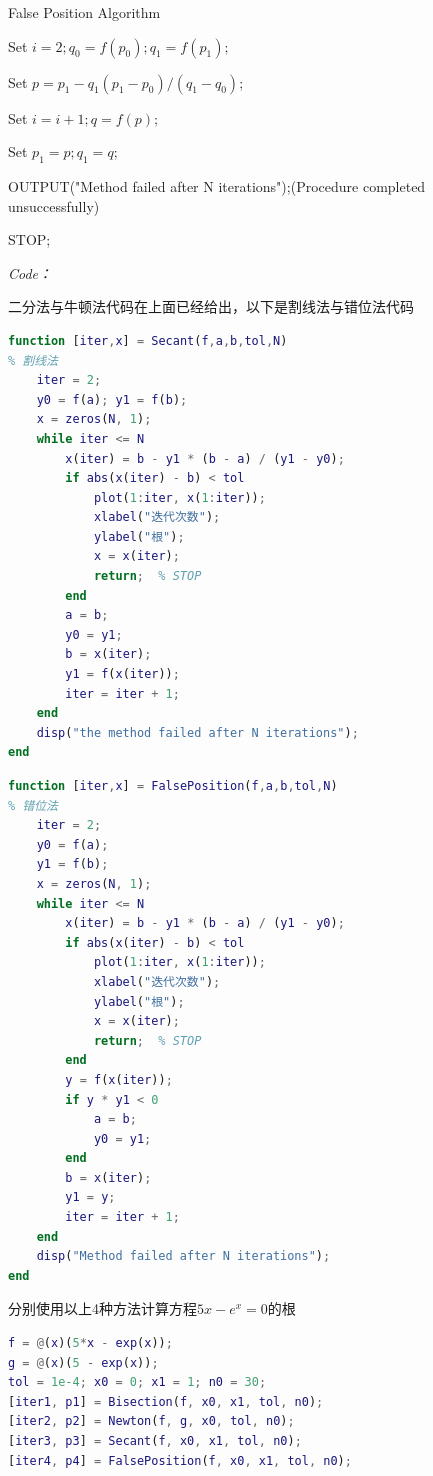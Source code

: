 \documentclass[12pt]{ctexart}
\begin{document}
\begin{algorithm}
	\caption{False Position Algorithm}
	Set $i=2; q_0=f(p_0); q_1=f(p_1);$
	
	{
		Set $p=p_1-q_1(p_1-p_0)/(q_1-q_0)$;
		
		
		Set $i=i+1; q=f(p);$
		
		
		Set $p_1=p; q_1=q;$
	}
	
	OUTPUT("Method failed after N iterations");(Procedure completed unsuccessfully)
	
	STOP;
\end{algorithm}
	
	\textit{Code：}
	
二分法与牛顿法代码在上面已经给出，以下是割线法与错位法代码

\begin{lstlisting}[language = MATLAB]
function [iter,x] = Secant(f,a,b,tol,N)
% 割线法
	iter = 2;
	y0 = f(a); y1 = f(b);
	x = zeros(N, 1);
	while iter <= N
		x(iter) = b - y1 * (b - a) / (y1 - y0);
		if abs(x(iter) - b) < tol
			plot(1:iter, x(1:iter));
			xlabel("迭代次数");
			ylabel("根");
			x = x(iter);
			return;  % STOP
		end
		a = b;
		y0 = y1;
		b = x(iter);
		y1 = f(x(iter));
		iter = iter + 1;
	end
	disp("the method failed after N iterations");
end
\end{lstlisting}

\begin{lstlisting}[language = MATLAB]
function [iter,x] = FalsePosition(f,a,b,tol,N)
% 错位法
	iter = 2;
	y0 = f(a);
	y1 = f(b);
	x = zeros(N, 1);
	while iter <= N
		x(iter) = b - y1 * (b - a) / (y1 - y0);
		if abs(x(iter) - b) < tol
			plot(1:iter, x(1:iter));
			xlabel("迭代次数");
			ylabel("根");
			x = x(iter);
			return;  % STOP
		end
		y = f(x(iter));
		if y * y1 < 0
			a = b;
			y0 = y1;
		end
		b = x(iter);
		y1 = y;
		iter = iter + 1;
	end
	disp("Method failed after N iterations");
end
\end{lstlisting}
分别使用以上4种方法计算方程$5x-e^x=0$的根
\begin{lstlisting}[language = MATLAB]
% 第2章第4题
f = @(x)(5*x - exp(x));
g = @(x)(5 - exp(x));
tol = 1e-4; x0 = 0; x1 = 1; n0 = 30;
[iter1, p1] = Bisection(f, x0, x1, tol, n0);
[iter2, p2] = Newton(f, g, x0, tol, n0);
[iter3, p3] = Secant(f, x0, x1, tol, n0);
[iter4, p4] = FalsePosition(f, x0, x1, tol, n0);
\end{lstlisting}
\end{document}
